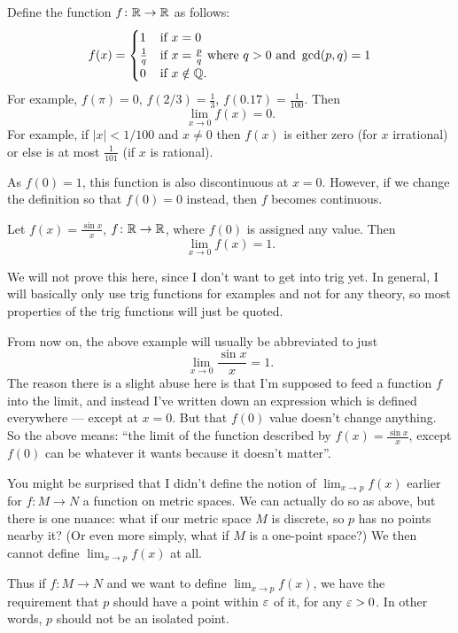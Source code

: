\begin{example}
	\label{ex:rational_piecewise}
	Define the function $f \colon \mathbb R \to \mathbb R$ as follows:
	\[ f(x) = \begin{cases}
			1 & \text{if } x = 0 \\
			\frac1q & \text{if } x = \frac pq \text{ where } q > 0
				\text{ and } \gcd(p,q) = 1 \\
			0 & \text{if } x \notin \mathbb Q.
		\end{cases} \]
	For example, $f(\pi) = 0$, $f(2/3) = \frac13$, $f(0.17) = \frac{1}{100}$.
	Then \[ \lim_{x \to 0} f(x) = 0. \]
	For example, if $|x| < 1/100$ and $x \neq 0$
	then $f(x)$ is either zero (for $x$ irrational)
	or else is at most $\frac{1}{101}$ (if $x$ is rational).

	As $f(0) = 1$, this function is also discontinuous at $x = 0$.
	However, if we change the definition so that $f(0) = 0$ instead,
	then $f$ becomes continuous.
\end{example}

\begin{example}
	Let $f(x) = \frac{\sin x}{x}$, $f \colon \mathbb R \to \mathbb R$,
	where $f(0)$ is assigned any value.
	Then
	\[ \lim_{x \to 0} f(x) = 1. \]
\end{example}
We will not prove this here,
since I don't want to get into trig yet.
In general, I will basically only use trig functions
for examples and not for any theory,
so most properties of the trig functions will just be quoted.
\begin{abuse}
	\label{abuse:limit}
	From now on, the above example
	will usually be abbreviated to just
	\[ \lim_{x \to 0} \frac{\sin x}{x} = 1. \]
	The reason there is a slight abuse here
	is that I'm supposed to feed a function $f$ into the limit,
	and instead I've written down an expression
	which is defined everywhere --- except at $x=0$.
	But that $f(0)$ value doesn't change anything.
	So the above means: ``the limit of the function described
	by $f(x) = \frac{\sin x}{x}$,
	except $f(0)$ can be whatever it wants because it doesn't matter''.
\end{abuse}

\begin{remark}
	You might be surprised that I didn't define
	the notion of $\lim_{x \to p} f(x)$ earlier
	for $f \colon M \to N$ a function on metric spaces.
	We can actually do so as above, but there is one nuance:
	what if our metric space $M$ is discrete,
	so $p$ has no points nearby it?
	(Or even more simply, what if $M$ is a one-point space?)
	We then cannot define $\lim_{x \to p} f(x)$ at all.

	Thus if $f \colon M \to N$ and we want to define
	$\lim_{x \to p} f(x)$, we have the requirement that $p$
	should have a point within $\varepsilon$ of it, for any $\varepsilon > 0$.
	In other words, $p$ should not be an isolated point.
\end{remark}

